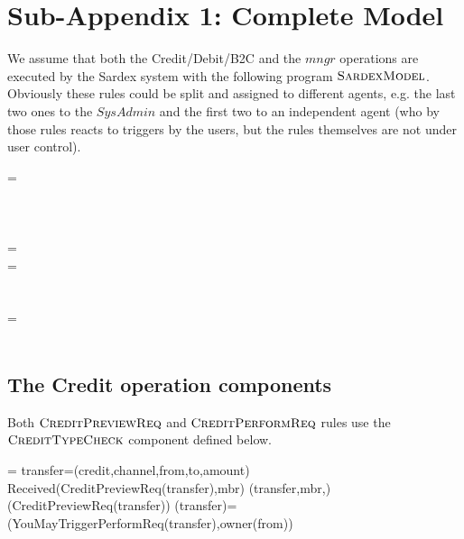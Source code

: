 \section{Sub-Appendix 1: Complete Model}
\label{sect:appendixModel}

We assume that both the Credit/Debit/B2C and the $mngr$ operations are executed by the Sardex system with the following program $\hbox{\sc SardexModel}$. Obviously these rules could be split and assigned to different agents, e.g. the last two ones to the $SysAdmin$ and the first two to an independent agent (who by those rules reacts to triggers by the users, but the rules themselves are not under user control).

\begin{asm}
 =\+
  \\
  \\
  \\
  \\
   \-
\WHERE \+
  =\+
      \\
      \-
  =\+
      \\
      \\
     \\
     \-
   =\+    
     	\\
     	\\
 \end{asm}
 
 \subsection{The Credit operation components}
 
 Both $\hbox{\sc CreditPreviewReq}$ and $ \hbox{\sc CreditPerformReq}$ rules use the $ \hbox{\sc CreditTypeCheck}$ component defined below.
 
 \begin{asm}
  =\+
    \LET transfer=(credit,channel,from,to,amount)\+
        \IF Received(CreditPreviewReq(transfer),\FROM mbr) \THEN \+   
           (transfer,mbr,)\\
            (CreditPreviewReq(transfer)) \-
      \WHERE \+
         (transfer)=\+
        (YouMayTriggerPerformReq(transfer),\TO owner(from))
 \end{asm}
 
